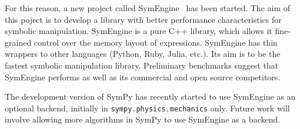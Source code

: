 For this reason, a new project called SymEngine~\cite{SymEngine} has been started.
The aim of this poject is to develop a library with better performance
characteristics for symbolic manipulation. SymEngine is a pure C++ library,
which allows it fine-grained control over the memory layout of expressions.
SymEngine has thin wrappers to other languages (Python, Ruby,
Julia, etc.). Its aim is to be the fastest symbolic manipulation library. Preliminary
benchmarks suggest that SymEngine performs as well as its commercial and
open source competitors.

The development version of SymPy has recently started to use SymEngine as an
optional backend, initially in \texttt{sympy.\allowbreak{}physics.\allowbreak{}mechanics} only.
Future work will involve
allowing more algorithms in SymPy to use SymEngine as a backend.

